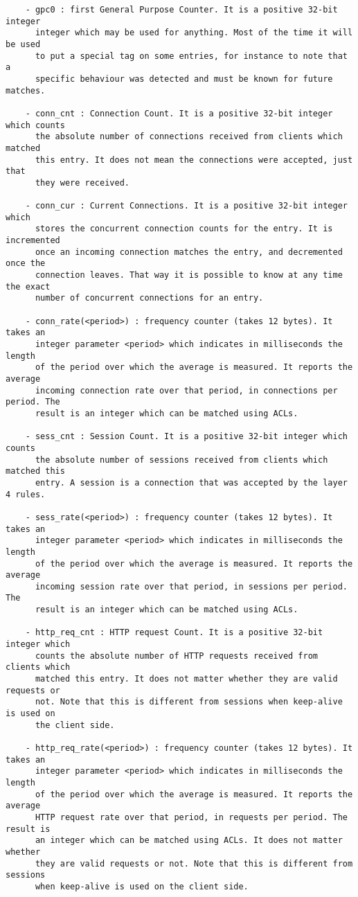 \begin{verbatim}
    - gpc0 : first General Purpose Counter. It is a positive 32-bit integer
      integer which may be used for anything. Most of the time it will be used
      to put a special tag on some entries, for instance to note that a
      specific behaviour was detected and must be known for future matches.

    - conn_cnt : Connection Count. It is a positive 32-bit integer which counts
      the absolute number of connections received from clients which matched
      this entry. It does not mean the connections were accepted, just that
      they were received.

    - conn_cur : Current Connections. It is a positive 32-bit integer which
      stores the concurrent connection counts for the entry. It is incremented
      once an incoming connection matches the entry, and decremented once the
      connection leaves. That way it is possible to know at any time the exact
      number of concurrent connections for an entry.

    - conn_rate(<period>) : frequency counter (takes 12 bytes). It takes an
      integer parameter <period> which indicates in milliseconds the length
      of the period over which the average is measured. It reports the average
      incoming connection rate over that period, in connections per period. The
      result is an integer which can be matched using ACLs.

    - sess_cnt : Session Count. It is a positive 32-bit integer which counts
      the absolute number of sessions received from clients which matched this
      entry. A session is a connection that was accepted by the layer 4 rules.

    - sess_rate(<period>) : frequency counter (takes 12 bytes). It takes an
      integer parameter <period> which indicates in milliseconds the length
      of the period over which the average is measured. It reports the average
      incoming session rate over that period, in sessions per period. The
      result is an integer which can be matched using ACLs.

    - http_req_cnt : HTTP request Count. It is a positive 32-bit integer which
      counts the absolute number of HTTP requests received from clients which
      matched this entry. It does not matter whether they are valid requests or
      not. Note that this is different from sessions when keep-alive is used on
      the client side.

    - http_req_rate(<period>) : frequency counter (takes 12 bytes). It takes an
      integer parameter <period> which indicates in milliseconds the length
      of the period over which the average is measured. It reports the average
      HTTP request rate over that period, in requests per period. The result is
      an integer which can be matched using ACLs. It does not matter whether
      they are valid requests or not. Note that this is different from sessions
      when keep-alive is used on the client side.


\end{verbatim}
